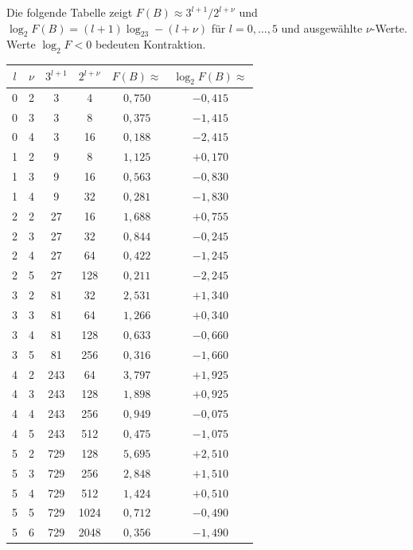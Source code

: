\documentclass[12pt,a4paper]{article}
\newcommand{\logt}{\log_2}        %
\begin{document}
Die folgende Tabelle zeigt $F(B) \approx 3^{l+1}/2^{l+\nu}$ und
$\logt F(B) = (l+1)\logt 3 - (l+\nu)$ für $l = 0, \ldots, 5$ und
ausgewählte $\nu$-Werte. Werte $\logt F < 0$ bedeuten Kontraktion.

\begin{center}
\renewcommand{\arraystretch}{1.35}
\begin{tabular}{cccccc}
\toprule
$l$ & $\nu$ & $3^{l+1}$ & $2^{l+\nu}$ & $F(B) \approx$ & $\logt F(B) \approx$ \\
\midrule
0 & 2 & 3 & 4  & $0{,}750$ & $-0{,}415$ \\
0 & 3 & 3 & 8  & $0{,}375$ & $-1{,}415$ \\
0 & 4 & 3 & 16 & $0{,}188$ & $-2{,}415$ \\
\midrule
1 & 2 & 9 & 8   & $1{,}125$ & $+0{,}170$ \\
1 & 3 & 9 & 16  & $0{,}563$ & $-0{,}830$ \\
1 & 4 & 9 & 32  & $0{,}281$ & $-1{,}830$ \\
\midrule
2 & 2 & 27 & 16  & $1{,}688$ & $+0{,}755$ \\
2 & 3 & 27 & 32  & $0{,}844$ & $-0{,}245$ \\
2 & 4 & 27 & 64  & $0{,}422$ & $-1{,}245$ \\
2 & 5 & 27 & 128 & $0{,}211$ & $-2{,}245$ \\
\midrule
3 & 2 & 81 & 32  & $2{,}531$ & $+1{,}340$ \\
3 & 3 & 81 & 64  & $1{,}266$ & $+0{,}340$ \\
3 & 4 & 81 & 128 & $0{,}633$ & $-0{,}660$ \\
3 & 5 & 81 & 256 & $0{,}316$ & $-1{,}660$ \\
\midrule
4 & 2 & 243 & 64   & $3{,}797$ & $+1{,}925$ \\
4 & 3 & 243 & 128  & $1{,}898$ & $+0{,}925$ \\
4 & 4 & 243 & 256  & $0{,}949$ & $-0{,}075$ \\
4 & 5 & 243 & 512  & $0{,}475$ & $-1{,}075$ \\
\midrule
5 & 2 & 729 & 128  & $5{,}695$ & $+2{,}510$ \\
5 & 3 & 729 & 256  & $2{,}848$ & $+1{,}510$ \\
5 & 4 & 729 & 512  & $1{,}424$ & $+0{,}510$ \\
5 & 5 & 729 & 1024 & $0{,}712$ & $-0{,}490$ \\
5 & 6 & 729 & 2048 & $0{,}356$ & $-1{,}490$ \\
\bottomrule
\end{tabular}
\end{center}
\end{document}
